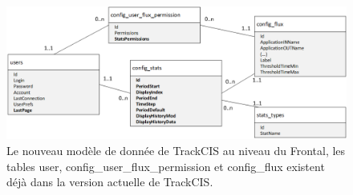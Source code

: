 			\begin{figure}[H]
				\centering
				\includegraphics[width=16cm]{../img/part3/modele_donnee.png}
				\caption{\label{modele_donnee} Le nouveau modèle de donnée de TrackCIS au
				niveau du Frontal, les tables user, config\_user\_flux\_permission et
				config\_flux existent déjà dans la version actuelle de TrackCIS.}
			\end{figure}
			
